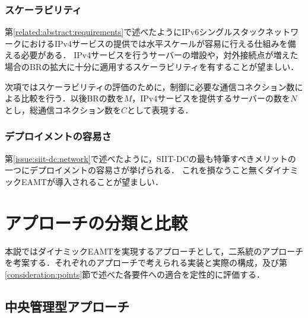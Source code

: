 \subsubsection{スケーラビリティ}
第\ref{related:abstract:requirements}で述べたようにIPv6シングルスタックネットワークにおけるIPv4サービスの提供では水平スケールが容易に行える仕組みを備える必要がある．
IPv4サービスを行うサーバーの増設や，対外接続点が増えた場合のBRの拡大に十分に適用するスケーラビリティを有することが望ましい．

次項ではスケーラビリティの評価のために，制御に必要な通信コネクション数による比較を行う．以後BRの数を$M$，IPv4サービスを提供するサーバーの数を$N$とし，総通信コネクション数を$C$として表現する．


%

\subsubsection{デプロイメントの容易さ}
第\ref{issue:siit-dc:network}で述べたように，SIIT-DCの最も特筆すべきメリットの一つにデプロイメントの容易さが挙げられる．
これを損なうこと無くダイナミックEAMTが導入されることが望ましい．


\section{アプローチの分類と比較}
\label{consideration:approach}
本説ではダイナミックEAMTを実現するアプローチとして，二系統のアプローチを考案する．それぞれのアプローチで考えられる実装と実際の構成，及び第\ref{consideration:points}節で述べた各要件への適合を定性的に評価する．



\subsection{中央管理型アプローチ}
\label{consideration:approach:centerized}

